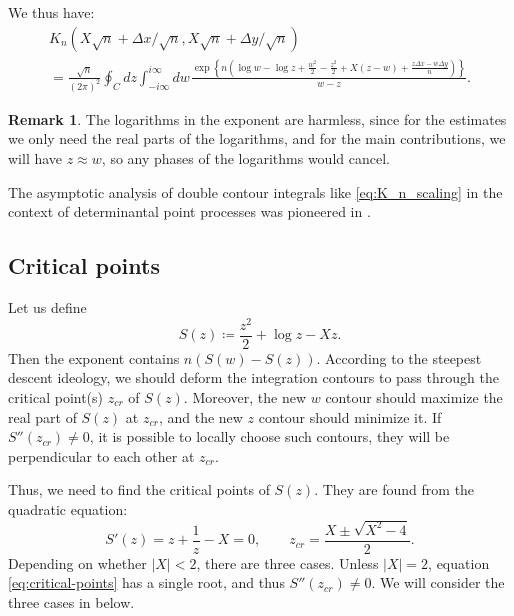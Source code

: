 \documentclass[letterpaper,11pt,oneside,reqno]{article}
\numberwithin{equation}{section}
\newcommand{\ssp}{\hspace{1pt}}
\theoremstyle{definition}
\newtheorem{remark}[proposition]{Remark}
\begin{document}
We thus have:
\begin{multline}
	\label{eq:K_n_scaling}
	K_n(X\sqrt n+\Delta x/\sqrt n,X\sqrt n+\Delta y/\sqrt n)\\=
	\frac{\sqrt n}{(2\pi)^2}
	\oint_C dz\int_{-i\infty}^{i\infty}dw\ssp
	\frac{\exp
		\left\{
			n\left(
				\log w -\log z
				+\frac{w^2}{2}-\frac{z^2}{2}
				+X(z-w)+\frac{z \Delta x-w \Delta y}{n}
			\right)
		\right\}
	}{w-z}.
\end{multline}
\begin{remark}
	\label{rmk:log-harmless}
	The logarithms in the exponent are harmless, since for the
	estimates we only need the real parts of the logarithms,
	and for the main contributions, we will have $z\approx w$, so
	any phases of the logarithms would cancel.
\end{remark}

The asymptotic analysis of double contour integrals like
\eqref{eq:K_n_scaling} in the context of determinantal point processes
was pioneered in \cite[Section~3]{Okounkov2002}.

\subsection{Critical points}
\label{sub:critical-points}

Let us define
\begin{equation*}
	S(z)\coloneqq
	\frac{z^2}{2}+\log z -X z.
\end{equation*}
Then the exponent contains $n \left( S(w)-S(z) \right)$.
According to the steepest descent ideology, we
should deform the integration contours
to pass through the critical point(s) $z_{cr}$ of $S(z)$.
Moreover, the new $w$ contour should maximize the real part of $S(z)$
at $z_{cr}$, and the new $z$ contour should minimize it.
If $S''(z_{cr})\ne 0$, it is possible to locally choose such contours,
they will be perpendicular to each other at $z_{cr}$.

Thus, we need to find the critical points of $S(z)$.
They are found from the quadratic equation:
\begin{equation}
	\label{eq:critical-points}
	S'(z)=z+\frac{1}{z}-X=0,\qquad
	z_{cr}=\frac{X\pm \sqrt{X^2-4}}{2}.
\end{equation}
Depending on whether $|X|<2$, there are three cases.
Unless $|X|=2$, equation \eqref{eq:critical-points} has a single root, and
thus $S''(z_{cr})\ne 0$.
We will consider the three cases in
below.
\end{document}
